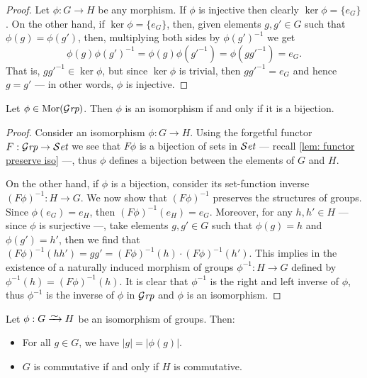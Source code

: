 \begin{proof}
  Let \(\phi: G \to H\) be any morphism. If \(\phi\) is injective then clearly
  \(\ker\phi = \{e_G\}\). On the other hand, if \(\ker\phi = \{e_G\}\), then,
  given elements \(g, g' \in G\) such that \(\phi(g) = \phi(g')\), then,
  multiplying both sides by \(\phi(g')^{-1}\) we get
  \[
    \phi(g)\phi(g')^{-1} = \phi(g) \phi(g'^{-1}) = \phi(gg'^{-1}) = e_G.
  \]
  That is, \(gg'^{-1} \in \ker\phi\), but since \(\ker\phi\) is trivial, then
  \(gg'^{-1} = e_G\) and hence \(g = g'\) --- in other words, \(\phi\) is
  injective.
\end{proof}

\begin{proposition}\label{prop: grp-iso-bij}
  Let \(\phi \in \operatorname{Mor}({\mathcal{G}\textit{rp}})\). Then \(\phi\) is an isomorphism if and only if it
  is a bijection.
\end{proposition}

\begin{proof}
  Consider an isomorphism \(\phi: G \to H\). Using the forgetful functor \(F:
  {\mathcal{G}\textit{rp}} \to {\mathcal{S}\textit{et}}\) we see that \(F\phi\) is a bijection of sets in \({\mathcal{S}\textit{et}}\) ---
  recall \cref{lem: functor preserve iso} ---, thus \(\phi\) defines a bijection
  between the elements of \(G\) and \(H\).

  On the other hand, if \(\phi\) is a bijection, consider its set-function
  inverse \((F\phi)^{-1}: H \to G\). We now show that \((F\phi)^{-1}\) preserves
  the structures of groups. Since \(\phi(e_G) = e_H\), then \((F\phi)^{-1}(e_H)
  = e_G\). Moreover, for any \(h, h' \in H\) --- since \(\phi\) is surjective
  ---, take elements \(g, g' \in G\) such that \(\phi(g) = h\) and \(\phi(g') =
  h'\), then we find that \((F\phi)^{-1}(hh') = g g' = (F\phi)^{-1}(h) \cdot
  (F\phi)^{-1}(h')\). This implies in the existence of a naturally induced
  morphism of groups \(\phi^{-1}: H \to G\) defined by \(\phi^{-1}(h) =
  (F\phi)^{-1}(h)\). It is clear that \(\phi^{-1}\) is the right and left
  inverse of \(\phi\), thus \(\phi^{-1}\) is the inverse of \(\phi\) in \({\mathcal{G}\textit{rp}}\)
  and \(\phi\) is an isomorphism.
\end{proof}

\begin{proposition}\label{prop: iso-order-com}
  Let \(\phi: G \isoto H\) be an isomorphism of groups. Then:
  \begin{itemize}
    \setlength\itemsep{0em}
    \item For all \(g \in G\), we have \(|g| = |\phi(g)|\).
    \item \(G\) is commutative if and only if \(H\) is commutative.
  \end{itemize}
\end{proposition}

